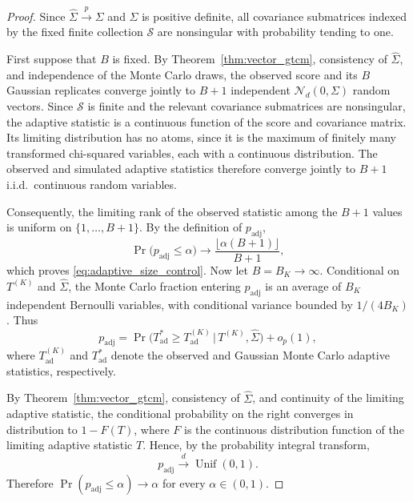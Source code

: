 \documentclass[12pt]{article}
\newcommand\given{\,|\,}
\numberwithin{equation}{section}
\begin{document}
\begin{proof}
Since $\hat\Sigma\xrightarrow{p}\Sigma$ and $\Sigma$ is positive definite,
all covariance submatrices indexed by the fixed finite collection
$\mathcal S$ are nonsingular with probability tending to one. 


First suppose that $B$ is fixed. By Theorem~\ref{thm:vector_gtcm},
consistency of $\hat\Sigma$, and independence of the Monte Carlo draws, the
observed score and its $B$ Gaussian replicates converge jointly to $B+1$
independent $\mathcal N_d(0,\Sigma)$ random vectors. Since $\mathcal S$ is
finite and the relevant covariance submatrices are nonsingular, the
adaptive statistic is a continuous function of the score and covariance
matrix. Its limiting distribution has no atoms, since it is
the maximum of finitely many transformed chi-squared variables, each
with a continuous distribution. The observed and
simulated adaptive statistics therefore converge jointly to $B+1$ i.i.d.\
continuous random variables.

Consequently, the limiting rank of the observed statistic among the
$B+1$ values is uniform on $\{1,\ldots,B+1\}$. By the definition of
$p_{\mathrm{adj}}$,
\begin{equation}
    \Pr \Big(p_{\mathrm{adj}}\leq\alpha\Big)
    \longrightarrow
    \frac{\lfloor \alpha(B+1)\rfloor}{B+1},
\end{equation}
which proves \eqref{eq:adaptive_size_control}. Now let $B=B_K\to\infty$. Conditional on $T^{(K)}$ and $\hat\Sigma$, the
Monte Carlo fraction entering $p_{\mathrm{adj}}$ is an average of
$B_K$ independent Bernoulli variables, with conditional variance bounded
by $1/(4B_K)$. Thus
\begin{equation}
    p_{\mathrm{adj}}
    =
    \Pr\big(
        T_{\mathrm{ad}}^{*}{\geq} T_{\mathrm{ad}}^{(K)}
        \given
        T^{(K)},\hat\Sigma
    \big)
    +o_p(1),
\end{equation}
where $T_{\mathrm{ad}}^{(K)}$ and $T_{\mathrm{ad}}^{*}$ denote the observed
and Gaussian Monte Carlo adaptive statistics, respectively.

By Theorem~\ref{thm:vector_gtcm}, consistency of $\hat\Sigma$, and
continuity of the limiting adaptive statistic, the conditional probability
on the right converges in distribution to $1-F(T)$, where $F$ is the
continuous distribution function of the limiting adaptive statistic
$T$. Hence, by the probability integral transform,
\begin{equation}
    p_{\mathrm{adj}}
    \xrightarrow{d}
    \operatorname{Unif}(0,1).
\end{equation}
Therefore
$\Pr(p_{\mathrm{adj}}\leq\alpha)\to\alpha$ for every
$\alpha\in(0,1)$.
\end{proof}


% 
% 
\end{document}

